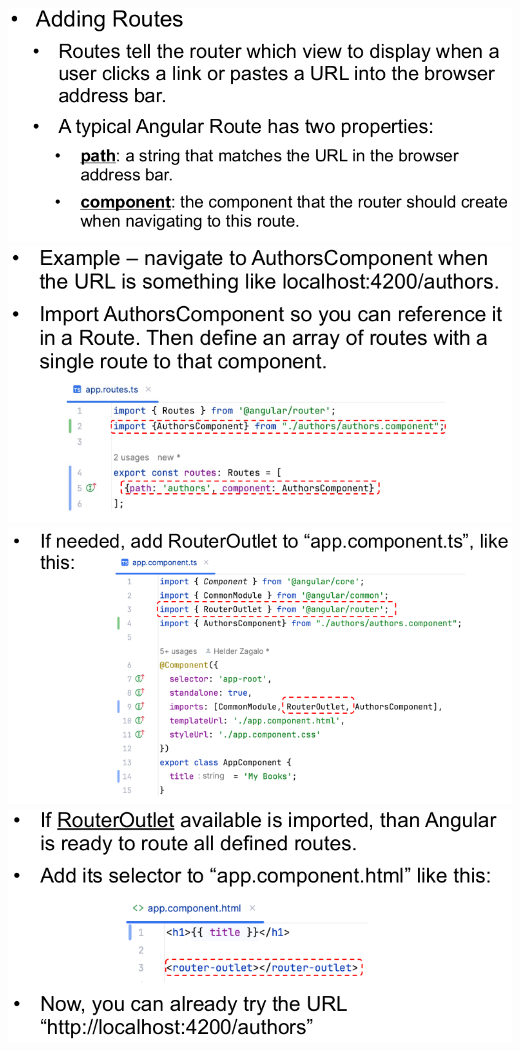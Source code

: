 \documentclass{article}
\begin{document}
\begin{center}
  \includegraphics[scale=0.3]{6}
  \includegraphics[scale=0.3]{7}
  \includegraphics[scale=0.3]{8}
  \includegraphics[scale=0.3]{9}

\end{center}
\end{document}
